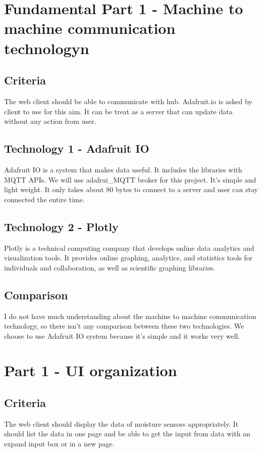 \documentclass[10pt,onecolumn,journal,draftclsnofoot]{IEEEtran}
\begin{document}
	\section{Fundamental Part 1 - Machine to machine communication technologyn}
	\subsection{Criteria}
	\par The web client should be able to communicate with hub. Adafruit.io is asked by client to use for this aim. It can be treat as a server that can update data without any action from user.
	
	\subsection{Technology 1 - Adafruit IO}
	\par
	Adafruit IO is a system that makes data useful. It includes the libraries with MQTT APIs. We will use adafrui\_MQTT broker for this project. It’s simple and light weight. It only takes about 80 bytes to connect to a server and user can stay connected the entire time. 
    \subsection{Technology 2 - Plotly}
	\par 
	Plotly is a technical computing company that develops online data analytics and visualization tools. It provides online graphing, analytics, and statistics tools for individuals and collaboration, as well as scientific graphing libraries. 
    \subsection{Comparison}
    \par 
    I do not have much understanding about the machine to machine communication technology, so there isn’t any comparison between these two technologies. We choose to use Adafruit IO system because it’s simple and it works very well.

	\section{Part 1 - UI organization}
	\subsection{Criteria}
	\par The web client should display the data of moisture sensors appropriately. It should list the data in one page and be able to get the input from data with an expand input box or in a new page.
	
\end{document}
